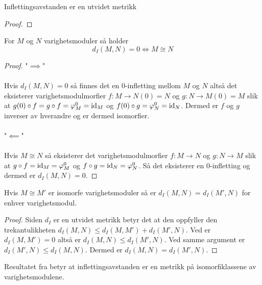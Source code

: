\begin{teorem}\label{trm:Utvidet-Metrikk}
  Inflettingsavstanden er en utvidet metrikk
\end{teorem}
\begin{proof}
    
\end{proof}

\begin{proposisjon}\label{prop:d_I-Iso}
	For $M$ og $N$ varighetsmoduler så holder
	\[d_I(M,N) = 0 \iff M\cong N\]
\end{proposisjon}
\begin{proof}
	"$\implies$"\\\\
	Hvis $d_I(M,N) = 0$ så finnes det en $0$-infletting mellom $M$ og $N$ altså det eksisterer varighetsmodulmorfier $f: M \to N(0)=N$ og $g: N\to M(0)=M$ slik at $g(0)\circ f = g\circ f = \varphi_M^0=\textnormal{id}_M$ og $f(0)\circ g = \varphi_N^0=\textnormal{id}_N$. Dermed er $f$ og $g$ inverser av hverandre og er dermed isomorfier.\\\\
	"$\impliedby$"\\\\
	Hvis $M\cong N$ så eksisterer det varighetsmodulmorfier $f:M\to N$ og $g:N\to M$ slik at $g\circ f = \textnormal{id}_M=\varphi_M^0$ og $f\circ g=\textnormal{id}_N=\varphi_N^0$. Så det eksisterer en $0$-infletting og dermed er $d_I(M,N) = 0$.
\end{proof}


\begin{proposisjon}\label{prop:InfAvs_Metrikk}
  Hvis $M\cong M'$ er isomorfe varighetsmoduler så er
  $d_I(M,N) = d_I(M',N)$ for enhver varighetsmodul.
\end{proposisjon}\begin{proof}
  Siden $d_I$ er en utvidet metrikk betyr det at den
  oppfyller den trekantulikheten $d_I(M,N)\leq
  d_I(M,M')+d_I(M',N)$. Ved
   er $d_I(M,M')=0$ altså
  er $d_I(M,N)\leq d_I(M',N)$. Ved samme argument er
  $d_I(M',N)\leq d_I(M,N)$. Dermed er
  $d_I(M,N)=d_I(M',N)$.
\end{proof}

Resultatet fra 
betyr at inflettingsavstanden er en metrikk på
isomorfiklassene av varighetsmodulene.

